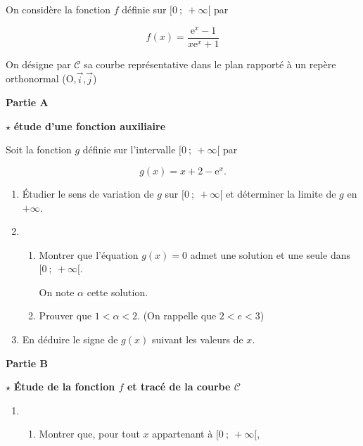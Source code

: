 \documentclass[a4paper, 11pt]{article}
\begin{document}
\begin{exercice}
   

\medskip

On considère la fonction $f$ définie sur $[0~;~+\infty[$ par

\[f(x)=\dfrac{\text{e}^{x}-1}{x\text{e}^{x}+1}\]

On désigne par $\mathcal{C}$ sa courbe représentative dans le plan rapporté
à un repère orthonormal (O,$\vec{i}$,$\vec{j}$)

\bigskip

\textbf{Partie A}

\medskip

\textbf{$\star$} \textbf{étude d'une fonction auxiliaire}

\medskip

Soit la fonction $g$ définie sur l'intervalle $[0~;~+\infty[$ par

\[g(x) = x + 2 - \text{e}^{x}.\]

\begin{enumerate}
\item Étudier le sens de variation de $g$ sur $[0~;~+\infty[$ et déterminer la limite de $g$ en $+\infty$.
\item
\begin{enumerate}
\item Montrer que l'équation $g(x)=0$ admet une solution et
une seule dans $[0~;~+\infty[$.

On note $\alpha$ cette solution.
\item Prouver que $1< \alpha<2$. (On rappelle que $2<e<3$)
\end{enumerate}
\item En déduire le signe de $g(x)$ suivant les valeurs de
$x$.
\end{enumerate}

\bigskip

\textbf{Partie B} 

\medskip

\textbf{$\star$} \textbf{Étude de la fonction $f$ et tracé de la courbe $\mathcal{C}$}

\medskip

\begin{enumerate}
\item 
	\begin{enumerate}
		\item Montrer que, pour tout $x$ appartenant à
$[0~;~+\infty[$,


\end{enumerate}
\end{enumerate}
\end{exercice}
\end{document}
